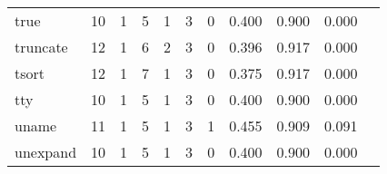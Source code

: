 \begin{longtable}{lp{1.20cm}p{1.20cm}p{1.20cm}p{1.20cm}p{1.20cm}p{1.20cm}p{1.20cm}p{1.20cm}p{1.20cm}p{1.20cm}}
true      &                                    10 &                                                  1 &                                                  5 &                                                  1 &                                                  3 &                                                  0 &                                         0.400 &                                              0.900 &                                              0.000 \\
truncate  &                                    12 &                                                  1 &                                                  6 &                                                  2 &                                                  3 &                                                  0 &                                         0.396 &                                              0.917 &                                              0.000 \\
tsort     &                                    12 &                                                  1 &                                                  7 &                                                  1 &                                                  3 &                                                  0 &                                         0.375 &                                              0.917 &                                              0.000 \\
tty       &                                    10 &                                                  1 &                                                  5 &                                                  1 &                                                  3 &                                                  0 &                                         0.400 &                                              0.900 &                                              0.000 \\
uname     &                                    11 &                                                  1 &                                                  5 &                                                  1 &                                                  3 &                                                  1 &                                         0.455 &                                              0.909 &                                              0.091 \\
unexpand  &                                    10 &                                                  1 &                                                  5 &                                                  1 &                                                  3 &                                                  0 &                                         0.400 &                                              0.900 &                                              0.000 \\

\end{longtable}
